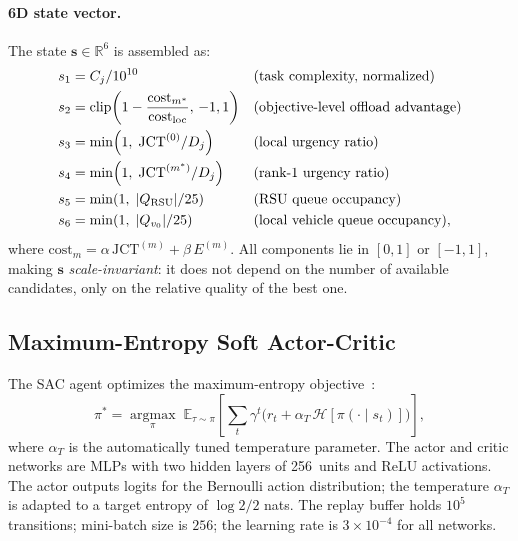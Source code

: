 \documentclass[iicol]{sn-jnl}
\begin{document}
\paragraph{6D state vector.}
The state $\mathbf{s} \in \mathbb{R}^6$ is assembled as:
\begin{align}
  s_1 &= C_j / 10^{10}                          & &\text{(task complexity, normalized)} \notag\\
  s_2 &= \mathrm{clip}\!\left(1 - \frac{\mathrm{cost}_{m^*}}
                                              {\mathrm{cost}_{\mathrm{loc}}},\,-1,1\right)
         & &\text{(objective-level offload advantage)} \notag\\
  s_3 &= \min\!\left(1,\; \mathrm{JCT}^{(0)} / D_j\right)
         & &\text{(local urgency ratio)} \notag\\
  s_4 &= \min\!\left(1,\; \mathrm{JCT}^{(m^*)} / D_j\right)
         & &\text{(rank-1 urgency ratio)} \notag\\
  s_5 &= \min\!\left(1,\; |Q_{\mathrm{RSU}}| / 25\right)
         & &\text{(RSU queue occupancy)} \notag\\
  s_6 &= \min\!\left(1,\; |Q_{v_0}| / 25\right)
         & &\text{(local vehicle queue occupancy),}
  \label{eq:state}
\end{align}
where $\mathrm{cost}_m = \alpha\,\mathrm{JCT}^{(m)} + \beta\,E^{(m)}$.
All components lie in $[0,1]$ or $[-1,1]$, making $\mathbf{s}$
\emph{scale-invariant}: it does not depend on the number of available
candidates, only on the relative quality of the best one.

\subsection{Maximum-Entropy Soft Actor-Critic}
\label{sec:sac}

The SAC agent optimizes the maximum-entropy objective~\cite{haarnoja2018sac}:
\begin{equation}
  \pi^* = \operatorname*{argmax}_\pi\;
  \mathbb{E}_{\tau \sim \pi}\!\left[
    \sum_{t} \gamma^t \bigl(r_t + \alpha_T\,\mathcal{H}[\pi(\cdot\mid s_t)]\bigr)
  \right],
  \label{eq:sac_obj}
\end{equation}
where $\alpha_T$ is the automatically tuned temperature parameter.
The actor and critic networks are MLPs with two hidden layers of 256~units and
ReLU activations.
The actor outputs logits for the Bernoulli action distribution; the
temperature $\alpha_T$ is adapted to a target entropy of $\log 2 / 2$ nats.
The replay buffer holds $10^5$ transitions; mini-batch size is $256$; the
learning rate is $3 \times 10^{-4}$ for all networks.
\end{document}
